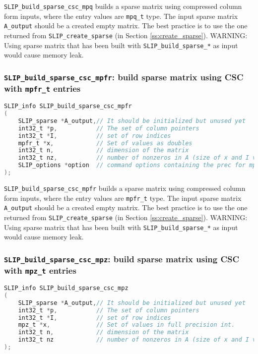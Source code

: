 \documentclass[11pt]{article}
\theoremstyle{definition}
\begin{document}
\verb|SLIP_build_sparse_csc_mpq| builds a sparse matrix using compressed column form inputs, where the entry values are \verb|mpq_t| type. The input sparse matrix \verb|A_output| should be a created empty matrix. The best practice is to use the one returned from \verb|SLIP_create_sparse| (in Section \ref{ss:create_sparse}). WARNING: Using sparse matrix that has been built with \verb|SLIP_build_sparse_*| as input would cause memory leak.

\cprotect\subsubsection{\verb|SLIP_build_sparse_csc_mpfr|: build sparse matrix using CSC with \verb|mpfr_t| entries}\label{s:user:build_sparse_csc_mpfr}
\begin{lstlisting}[language=C,frame=single]
SLIP_info SLIP_build_sparse_csc_mpfr
(
    SLIP_sparse *A_output,// It should be initialized but unused yet
    int32_t *p,           // The set of column pointers
    int32_t *I,           // set of row indices
    mpfr_t *x,            // Set of values as doubles
    int32_t n,            // dimension of the matrix
    int32_t nz,           // number of nonzeros in A (size of x and I vectors)
    SLIP_options *option  // command options containing the prec for mpfr
);
\end{lstlisting}

\verb|SLIP_build_sparse_csc_mpfr| builds a sparse matrix using compressed column form inputs, where the entry values are \verb|mpfr_t| type. The input sparse matrix \verb|A_output| should be a created empty matrix. The best practice is to use the one returned from \verb|SLIP_create_sparse| (in Section \ref{ss:create_sparse}). WARNING: Using sparse matrix that has been built with \verb|SLIP_build_sparse_*| as input would cause memory leak.


\cprotect\subsubsection{\verb|SLIP_build_sparse_csc_mpz|: build sparse matrix using CSC with \verb|mpz_t| entries}\label{s:user:build_sparse_csc_mpz}
\begin{lstlisting}[language=C,frame=single]
SLIP_info SLIP_build_sparse_csc_mpz
(
    SLIP_sparse *A_output,// It should be initialized but unused yet
    int32_t *p,           // The set of column pointers
    int32_t *I,           // set of row indices
    mpz_t *x,             // Set of values in full precision int.
    int32_t n,            // dimension of the matrix
    int32_t nz            // number of nonzeros in A (size of x and I vectors)
);
\end{lstlisting}
\end{document}
